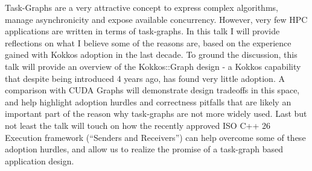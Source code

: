 Task-Graphs are a very attractive concept to express complex algorithms, manage asynchronicity and expose available concurrency. However, very few HPC applications are written in terms of task-graphs. In this talk I will provide reflections on what I believe some of the reasons are, based on the experience gained with Kokkos adoption in the last decade. To ground the discussion, this talk will provide an overview of the Kokkos::Graph design - a Kokkos capability that despite being introduced 4 years ago, has found very little adoption. A comparison with CUDA Graphs will demonstrate design tradeoffs in this space, and help highlight adoption hurdles and correctness pitfalls that are likely an important part of the reason why task-graphs are not more widely used. Last but not least the talk will touch on how the recently approved ISO C++ 26 Execution framework (“Senders and Receivers”) can help overcome some of these adoption hurdles, and allow us to realize the promise of a task-graph based application design.
